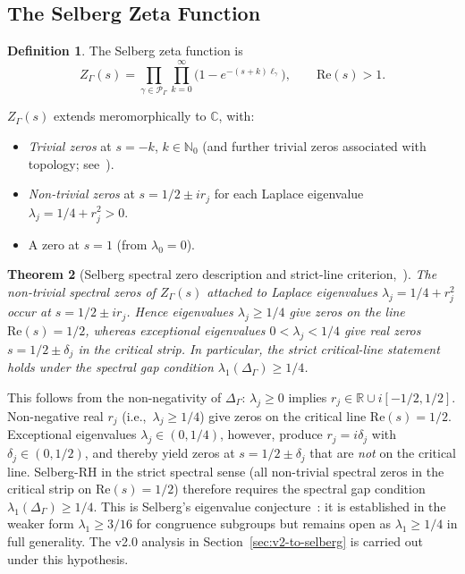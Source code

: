 \documentclass[12pt,a4paper]{article}
\newtheorem{theorem}{Theorem}[section]
\theoremstyle{definition}
\newtheorem{definition}[theorem]{Definition}
\theoremstyle{remark}
\newcommand{\RR}{\mathbb{R}}
\newcommand{\CC}{\mathbb{C}}
\newcommand{\NN}{\mathbb{N}}
\newcommand{\Sel}{Z_{\Gamma}}
\newcommand{\Delop}{\Delta_{\Gamma}}
\begin{document}
\subsection{The Selberg Zeta Function}

\begin{definition}
\label{def:Selberg-zeta}
The Selberg zeta function is
\begin{equation}
\label{eq:Sel-def}
\Sel(s) = \prod_{\gamma \in \mathcal{P}_\Gamma}\prod_{k=0}^\infty \bigl(1 - e^{-(s+k)\ell_\gamma}\bigr),\qquad \mathrm{Re}(s) > 1.
\end{equation}
\end{definition}

$\Sel(s)$ extends meromorphically to $\CC$, with:

\begin{itemize}
\item \emph{Trivial zeros} at $s = -k$, $k \in \NN_0$ (and further trivial zeros
associated with topology; see~\cite{Hejhal1976}).
\item \emph{Non-trivial zeros} at $s = 1/2 \pm ir_j$ for each
Laplace eigenvalue $\lambda_j = 1/4 + r_j^2 > 0$.
\item A zero at $s = 1$ (from $\lambda_0 = 0$).
\end{itemize}

\begin{theorem}[Selberg spectral zero description and strict-line criterion,~\cite{Selberg1956}]
\label{thm:Sel-RH}
The non-trivial spectral zeros of $\Sel(s)$ attached to Laplace eigenvalues
$\lambda_j=1/4+r_j^2$ occur at $s=1/2\pm ir_j$. Hence eigenvalues
$\lambda_j\ge 1/4$ give zeros on the line $\mathrm{Re}(s)=1/2$, whereas
exceptional eigenvalues $0<\lambda_j<1/4$ give real zeros
$s=1/2\pm\delta_j$ in the critical strip. In particular, the strict
critical-line statement holds under the spectral gap condition
$\lambda_1(\Delop)\ge 1/4$.
\end{theorem}

This follows from the non-negativity of $\Delop$: $\lambda_j \ge 0$ implies
$r_j \in \RR \cup i[-1/2, 1/2]$.  Non-negative real $r_j$ (i.e.,\ $\lambda_j \ge
1/4$) give zeros on the critical line $\mathrm{Re}(s)=1/2$.  Exceptional
eigenvalues $\lambda_j \in (0,1/4)$, however, produce $r_j = i\delta_j$ with
$\delta_j \in (0,1/2)$, and thereby yield zeros at $s = 1/2 \pm \delta_j$
that are \emph{not} on the critical line.  Selberg-RH in the strict spectral
sense (all non-trivial spectral zeros in the critical strip on
$\mathrm{Re}(s)=1/2$) therefore requires the
spectral gap condition $\lambda_1(\Delop) \ge 1/4$.  This is Selberg's
eigenvalue conjecture~\cite{Selberg1965}: it is established in the weaker form
$\lambda_1 \ge 3/16$ for congruence subgroups but remains open as
$\lambda_1 \ge 1/4$ in full generality.  The v2.0 analysis in
Section~\ref{sec:v2-to-selberg} is carried out under this hypothesis.
\end{document}
